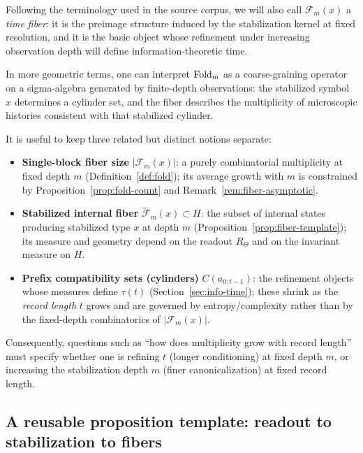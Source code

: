 Following the terminology used in the source corpus, we will also call $\mathcal{F}_m(x)$ a \emph{time fiber}: it is the preimage structure induced by the stabilization kernel at fixed resolution, and it is the basic object whose refinement under increasing observation depth will define information-theoretic time.

In more geometric terms, one can interpret $\mathrm{Fold}_m$ as a coarse-graining operator on a sigma-algebra generated by finite-depth observations: the stabilized symbol $x$ determines a cylinder set, and the fiber describes the multiplicity of microscopic histories consistent with that stabilized cylinder.

\begin{remark}\label{rem:fiber-vs-cylinder}
It is useful to keep three related but distinct notions separate:
\begin{itemize}[leftmargin=*,itemsep=2pt]
  \item \textbf{Single-block fiber size} $|\mathcal{F}_m(x)|$: a purely combinatorial multiplicity at fixed depth $m$ (Definition~\ref{def:fold}); its average growth with $m$ is constrained by Proposition~\ref{prop:fold-count} and Remark~\ref{rem:fiber-asymptotic}.
  \item \textbf{Stabilized internal fiber} $\widetilde{\mathcal{F}}_m(x)\subset H$: the subset of internal states producing stabilized type $x$ at depth $m$ (Proposition~\ref{prop:fiber-template}); its measure and geometry depend on the readout $R_\Theta$ and on the invariant measure on $H$.
  \item \textbf{Prefix compatibility sets (cylinders)} $C(a_{0:t-1})$: the refinement objects whose measures define $\tau(t)$ (Section~\ref{sec:info-time}); these shrink as the \emph{record length} $t$ grows and are governed by entropy/complexity rather than by the fixed-depth combinatorics of $|\mathcal{F}_m(x)|$.
\end{itemize}
Consequently, questions such as ``how does multiplicity grow with record length'' must specify whether one is refining $t$ (longer conditioning) at fixed depth $m$, or increasing the stabilization depth $m$ (finer canonicalization) at fixed record length.
\end{remark}

\subsection{A reusable proposition template: readout to stabilization to fibers}\label{sec:stabilization:template}

